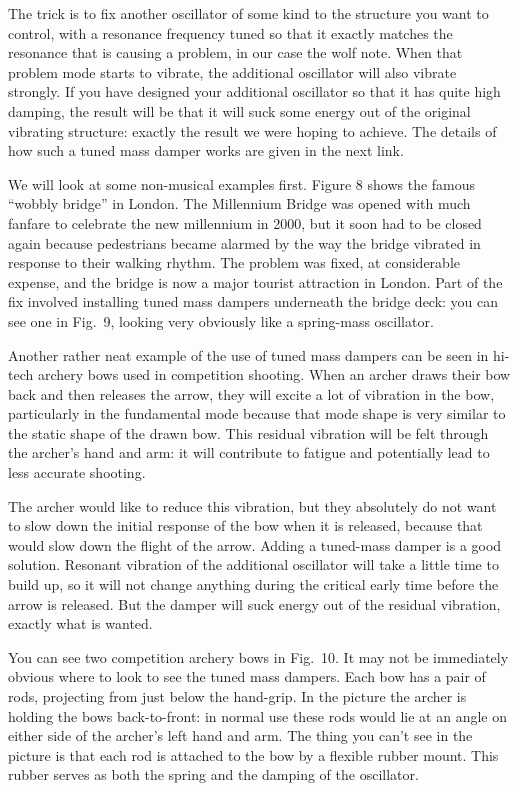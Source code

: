   The trick is to fix another oscillator of some kind to the structure you want 
  to control, with a resonance frequency tuned so that it exactly matches the 
  resonance that is causing a problem, in our case the wolf note. When that 
  problem mode starts to vibrate, the additional oscillator will also vibrate 
  strongly. If you have designed your additional oscillator so that it has 
  quite high damping, the result will be that it will suck some energy out of 
  the original vibrating structure: exactly the result we were hoping to 
  achieve. The details of how such a tuned mass damper works are given in the 
  next link. 

  We will look at some non-musical examples first. Figure 8 shows the famous 
  “wobbly bridge” in London. The Millennium Bridge was opened with much fanfare 
  to celebrate the new millennium in 2000, but it soon had to be closed again 
  because pedestrians became alarmed by the way the bridge vibrated in response 
  to their walking rhythm. The problem was fixed, at considerable expense, and 
  the bridge is now a major tourist attraction in London. Part of the fix 
  involved installing tuned mass dampers underneath the bridge deck: you can 
  see one in Fig.\ 9, looking very obviously like a spring-mass oscillator. 

  Another rather neat example of the use of tuned mass dampers can be seen in 
  hi-tech archery bows used in competition shooting. When an archer draws their 
  bow back and then releases the arrow, they will excite a lot of vibration in 
  the bow, particularly in the fundamental mode because that mode shape is very 
  similar to the static shape of the drawn bow. This residual vibration will be 
  felt through the archer’s hand and arm: it will contribute to fatigue and 
  potentially lead to less accurate shooting. 

  The archer would like to reduce this vibration, but they absolutely do not 
  want to slow down the initial response of the bow when it is released, 
  because that would slow down the flight of the arrow. Adding a tuned-mass 
  damper is a good solution. Resonant vibration of the additional oscillator 
  will take a little time to build up, so it will not change anything during 
  the critical early time before the arrow is released. But the damper will 
  suck energy out of the residual vibration, exactly what is wanted. 

  You can see two competition archery bows in Fig.\ 10. It may not be 
  immediately obvious where to look to see the tuned mass dampers. Each bow has 
  a pair of rods, projecting from just below the hand-grip. In the picture the 
  archer is holding the bows back-to-front: in normal use these rods would lie 
  at an angle on either side of the archer’s left hand and arm. The thing you 
  can't see in the picture is that each rod is attached to the bow by a 
  flexible rubber mount. This rubber serves as both the spring and the damping 
  of the oscillator. 

